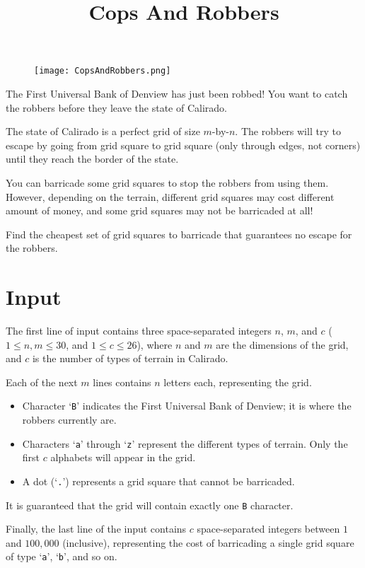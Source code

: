 \documentclass{article}
\title{Cops And Robbers}
\date{}
\begin{document}
\maketitle
\begin{figure}[h!]
\centering
\texttt{[image: CopsAndRobbers.png]}
\end{figure}


The First Universal Bank of Denview has just been robbed! You want
to catch the robbers before they leave the state of Calirado.

The state of Calirado is a perfect grid of size $m$-by-$n$.
The robbers will try to escape by going from grid square to grid square
(only through edges, not corners) until they reach the border
of the state.

You can barricade some grid squares to stop the robbers from using them.
However, depending on the terrain, different grid squares may cost
different amount of money,
and some grid squares may not be barricaded at all!

Find the cheapest set of grid squares to barricade that guarantees no escape
for the robbers.

\section{Input}

The first line of input contains three space-separated integers
$n$, $m$, and $c$ ($1 \le n, m \le 30$, and $1 \le c \le 26$),
where $n$ and $m$ are the dimensions of the grid, and $c$ is the
number of types of terrain in Calirado.

Each of the next $m$ lines contains $n$ letters each, representing the grid.
\begin{itemize}
	\item Character `{\tt B}' indicates the First Universal Bank of Denview;
	it is where the robbers currently are.
	\item Characters `{\tt a}' through `{\tt z}' represent the different
	types of terrain. Only the first $c$ alphabets will appear in the grid.
	\item A dot (`{\tt .}') represents a grid square that cannot be barricaded.
\end{itemize}
It is guaranteed that the grid will contain exactly one \texttt{B} character.

Finally, the last line of the input contains $c$ space-separated integers
between $1$ and $100{,}000$ (inclusive), representing the cost of
barricading a single grid square of type `{\tt a}', `{\tt b}', and so on.
\end{document}
